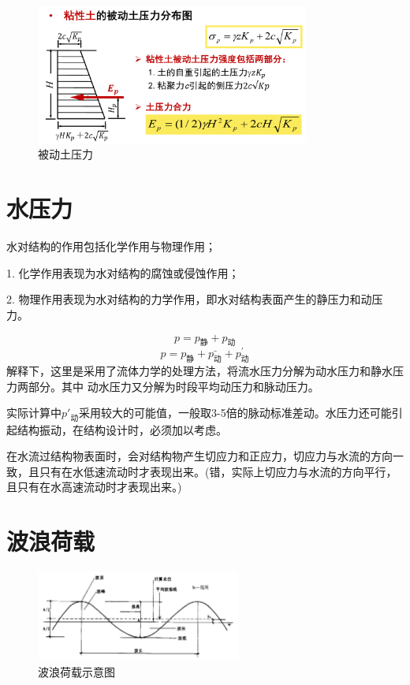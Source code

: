 \documentclass[12pt, a4paper, oneside, UTF8]{ctexbook}
\begin{document}
\begin{figure}[H]
    \centering
    \includegraphics[width=0.8\textwidth]{../figure/beidong.png}
    \caption{被动土压力}
\end{figure}

\section{水压力}

水对结构的作用包括化学作用与物理作用；

1. 化学作用表现为水对结构的腐蚀或侵蚀作用；

2. 物理作用表现为水对结构的力学作用，即水对结构表面产生的静压力和动压力。

\begin{definition}
\[
p = p_{\text{静}} + p_{\text{动}}
\]
\[
p = p_{\text{静}} + \bar{p_{\text{动}}} + p_{\text{动}}^{\prime}
\]  
解释下，这里是采用了流体力学的处理方法，将流水压力分解为动水压力和静水压力两部分。其中
动水压力又分解为时段平均动压力和脉动压力。
\end{definition}

\begin{remark}
    实际计算中\( p'_{\text{动}} \)采用较大的可能值，一般取3-5倍的脉动标准差动。水压力还可能引起结构振动，在结构设计时，必须加以考虑。
\end{remark}

\begin{example}
    在水流过结构物表面时，会对结构物产生切应力和正应力，切应力与水流的方向一致，且只有在水低速流动时才表现出来。(错，实际上切应力与水流的方向平行，且只有在水高速流动时才表现出来。)
\end{example}

\section{波浪荷载}

\begin{figure}[H]
    \centering
    \includegraphics[width=0.6\textwidth]{../figure/bol.png}
    \caption{波浪荷载示意图}
\end{figure}
\end{document}
